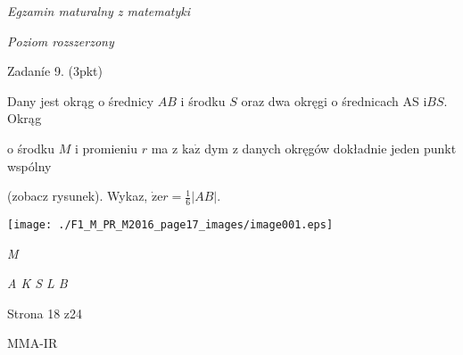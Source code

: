 \documentclass[a4paper,12pt]{article}
\begin{document}
{\it Egzamin maturalny z matematyki}

{\it Poziom rozszerzony}

Zadaníe 9. (3pkt)

Dany jest okrąg o średnicy $AB$ i środku $S$ oraz dwa okręgi o średnicach AS $\mathrm{i}BS$. Okrąg

o środku $M$ i promieniu $r$ ma z $\mathrm{k}\mathrm{a}\dot{\mathrm{z}}$ dym z danych okręgów dokładnie jeden punkt wspólny

(zobacz rysunek). Wykaz, $\displaystyle \dot{\mathrm{z}}\mathrm{e}r=\frac{1}{6}|AB|.$
\begin{center}
\texttt{[image: ./F1\_M\_PR\_M2016\_page17\_images/image001.eps]}
\end{center}
{\it M}

{\it A  K S  L  B}

Strona 18 z24

MMA-IR
\end{document}
